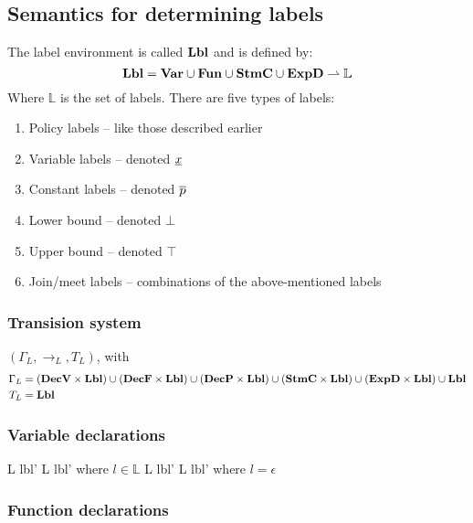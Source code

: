 \subsection{Semantics for determining labels}
The label environment is called $\mathbf{Lbl}$ and is defined by:
\[
  \mathbf{Lbl} = \mathbf{Var} \cup \mathbf{Fun} \cup \mathbf{StmC} \cup \mathbf{ExpD} \rightharpoonup \mathbb{L}
\]
Where $\mathbb{L}$ is the set of labels.
There are five types of labels:
\begin{enumerate}
  \item Policy labels -- like those described earlier
  \item Variable labels -- denoted $\underline{x}$
  \item Constant labels -- denoted $\overline{p}$
  \item Lower bound -- denoted $\bot$
  \item Upper bound -- denoted $\top$
  \item Join/meet labels -- combinations of the above-mentioned labels
\end{enumerate}

\subsubsection{Transision system}
$(\Gamma_{L}, \rightarrow_{L}, T_{L})$, with
\begin{align*}
  \Gamma_{L} & = (\mathbf{DecV} \times \mathbf{Lbl}) \cup (\mathbf{DecF} \times \mathbf{Lbl}) \cup (\mathbf{DecP} \times \mathbf{Lbl}) \cup (\mathbf{StmC} \times \mathbf{Lbl}) \cup (\mathbf{ExpD} \times \mathbf{Lbl}) \cup \mathbf{Lbl} \\
  T_{L} & = \mathbf{Lbl}
\end{align*}

\subsubsection{Variable declarations}

\begin{trules}
        { {L} {lbl'} }
        { {L} {lbl'} }
        {where $l \in \mathbb{L}$}
        { {L} {lbl'} }
        { {L} {lbl'} }
        {where $l = \epsilon$}
\end{trules}

\subsubsection{Function declarations}

